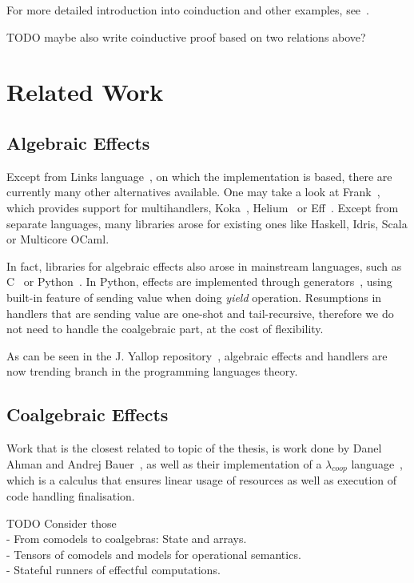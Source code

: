 \documentclass[declaration,shortabstract]{iithesis}
\theoremstyle{definition} \newtheorem{definition}{Definition}[chapter]
\theoremstyle{remark} \newtheorem{remark}[definition]{Observation}
\theoremstyle{plain} \newtheorem{theorem}[definition]{Theorem}
\theoremstyle{plain} \newtheorem{lemma}[definition]{Lemma}
\begin{document}
    \noindent
    For more detailed introduction into coinduction and other examples,
    see~\cite{jacobs-rutten, sangiorgi-intro}.

    \noindent
    TODO maybe also write coinductive proof based on two relations above?

\section{Related Work}
    \subsection{Algebraic Effects}

    Except from Links language~\cite{handlers-cps}, on which the implementation
    is based, there are currently many other alternatives available. One may take
    a look at Frank~\cite{frank}, which provides support for multihandlers,
    Koka~\cite{leijen-koka}, Helium~\cite{helium} or Eff~\cite{eff}. Except from
    separate languages, many libraries arose for existing ones like Haskell,
    Idris, Scala or Multicore OCaml.

    In fact, libraries for algebraic effects also arose in mainstream languages,
    such as C~\cite{leijen-c} or Python~\cite{python-effect}. In Python,
    effects are implemented through generators~\cite{one-shot}, using built-in
    feature of sending value when doing \textit{yield} operation. Resumptions in
    handlers that are sending value are one-shot and tail-recursive, therefore
    we do not need to handle the coalgebraic part, at the cost of flexibility.

    As can be seen in the J. Yallop repository~\cite{effects-bibliography}, algebraic
    effects and handlers are now trending branch in the programming languages theory.

    \subsection{Coalgebraic Effects}

    Work that is the closest related to topic of the thesis, is work done by
    Danel Ahman and Andrej Bauer~\cite{runners-in-action}, as well as their
    implementation of a $\lambda_{coop}$ language~\cite{coop}, which is a
    calculus that ensures linear usage of resources as well as execution of
    code handling finalisation.

\noindent
TODO Consider those\\
- From comodels to coalgebras: State and arrays.\\
- Tensors of comodels and models for operational semantics.\\
- Stateful runners of effectful computations.
\end{document}
